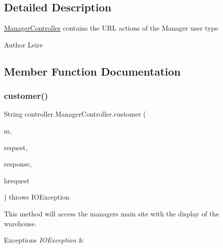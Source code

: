 \subsection{Detailed Description}
\mbox{\hyperlink{classcontroller_1_1_manager_controller}{Manager\+Controller}} contains the U\+RL actions of the Manager user type \begin{DoxyAuthor}{Author}
Leire 
\end{DoxyAuthor}


\subsection{Member Function Documentation}
\mbox{\label{classcontroller_1_1_manager_controller_aa49d493a4fb9aa5f0e99f942b21d3991}} 
\subsubsection{\texorpdfstring{customer()}{customer()}}
{\footnotesize\ttfamily String controller.\+Manager\+Controller.\+customer (\begin{DoxyParamCaption}\item[{Model}]{m,  }\item[{Web\+Request}]{request,  }\item[{Http\+Servlet\+Response}]{response,  }\item[{Http\+Servlet\+Request}]{hrequest }\end{DoxyParamCaption}) throws I\+O\+Exception\hspace{0.3cm}{\ttfamily [inline]}}

This method will access the manager\textquotesingle{}s main site with the display of the warehouse. 
\begin{DoxyExceptions}{Exceptions}
{\em I\+O\+Exception} & \\
\hline
\end{DoxyExceptions}
\mbox{\label{classcontroller_1_1_manager_controller_a06fcd2a1ad144e711de97430841a804f}} 
